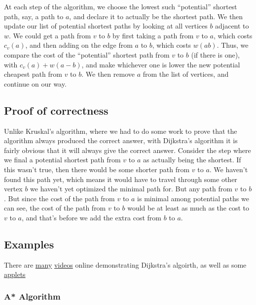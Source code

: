 \documentclass[]{article}
\begin{document}
At each step of the algorithm, we choose the lowest such ``potential''
shortest path, say, a path to \(a\), and declare it to actually be the
shortest path. We then update our list of potential shortest paths by
looking at all vertices \(b\) adjacent to \(w\). We could get a path
from \(v\) to \(b\) by first taking a path from \(v\) to \(a\), which
costs \(c_v(a)\), and then adding on the edge from \(a\) to \(b\), which
costs \(w(ab)\). Thus, we compare the cost of the ``potential'' shortest
path from \(v\) to \(b\) (if there is one), with \(c_v(a)+w(a-b)\), and
make whichever one is lower the new potential cheapest path from \(v\)
to \(b\). We then remove \(a\) from the list of vertices, and continue
on our way.

\subsection{Proof of correctness}\label{proof-of-correctness}

Unlike Kruskal's algorithm, where we had to do some work to prove that
the algorithm always produced the correct answer, with Dijkstra's
algorithm it is fairly obvious that it will always give the correct
answer. Consider the step where we final a potential shortest path from
\(v\) to \(a\) as actually being the shortest. If this wasn't true, then
there would be some shorter path from \(v\) to \(a\). We haven't found
this path yet, which means it would have to travel through some other
vertex \(b\) we haven't yet optimized the minimal path for. But any path
from \(v\) to \(b\). But since the cost of the path from \(v\) to \(a\)
is minimal among potential paths we can see, the cost of the path from
\(v\) to \(b\) would be at least as much as the cost to \(v\) to \(a\),
and that's before we add the extra cost from \(b\) to \(a\).

\subsection{Examples}\label{examples-3}

There are \href{https://www.youtube.com/watch?v=0nVYi3o161A}{many}
\href{https://www.youtube.com/watch?v=WN3Rb9wVYDY}{videos} online
demonstrating Dijkstra's algoirth, as well as some
\href{http://optlab-server.sce.carleton.ca/POAnimations2007/DijkstrasAlgo.html}{applets}

\subsubsection{A* Algorithm}\label{a-algorithm}
\end{document}
